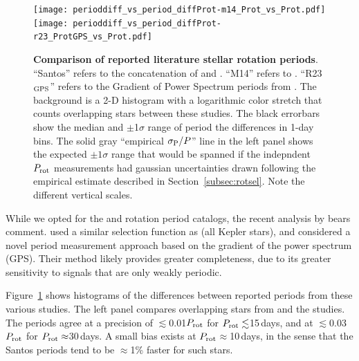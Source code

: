 \documentclass[11pt,twocolumn,tighten,linenumbers]{aastex63}
\begin{document}
\begin{figure}[!b]
  \begin{center}
    \leavevmode
      \texttt{[image: perioddiff\_vs\_period\_diffProt-m14\_Prot\_vs\_Prot.pdf]}
      \texttt{[image: perioddiff\_vs\_period\_diffProt-r23\_ProtGPS\_vs\_Prot.pdf]}
  \end{center}
  \vspace{-0.6cm}
  \caption{
    {\bf Comparison of reported literature stellar rotation periods}.
    ``Santos'' refers to the concatenation of \citet{Santos_2019} and
    \citet{Santos_2021}.  ``M14'' refers to \citet{McQuillan_2014}.
    ``R23$_{\rm GPS}$'' refers to the Gradient of Power Spectrum
    periods from \citet{Reinhold2023}.  The background is a 2-D
    histogram with a logarithmic color stretch that counts overlapping
    stars between these studies.  The black errorbars show the median
    and $\pm$1$\sigma$ range of period the differences in 1-day bins.
    The
    solid gray ``empirical $\sigma_{\rm P}/P$'' line in the left panel
    shows the expected $\pm 1\sigma$ range that would be spanned if
    the indepndent $P_{\rm rot}$ measurements had gaussian
    uncertainties drawn following the empirical estimate described in
    Section~\ref{subsec:rotsel}.
    Note the different vertical scales.
    \label{fig:perioddiff}
  }
\end{figure}

While we opted for the  and
 rotation period catalogs, the recent
analysis by \citet{Reinhold2023} bears comment.  \citet{Reinhold2023}
used a similar selection function as \citeauthor{Santos_2021}
(all Kepler stars), and considered a novel period measurement
approach based on the gradient of the power spectrum (GPS).  Their method
likely provides greater completeness, due to its greater sensitivity
to signals that are only weakly periodic.  

Figure~\ref{fig:perioddiff} shows histograms of the differences
between reported periods from these various studies.  The left panel
compares overlapping stars from \citet{McQuillan_2014} and
the \citeauthor{Santos_2021} studies.  The periods agree at a precision of
$\lesssim$0.01$P_{\rm rot}$ for $P_{\rm rot}\lesssim$15\,days, and at
$\lesssim$0.03$P_{\rm rot}$ for $P_{\rm rot}\approx$30\,days.  
A small bias exists at $P_{\rm rot}$$\approx$10\,days,
in the sense that the Santos periods tend to be $\approx$1\% faster
for such stars.
\end{document}

